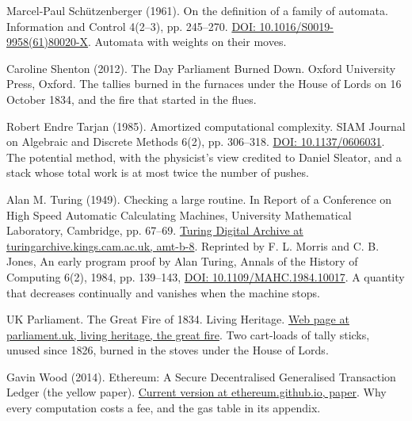 \documentclass[11pt,twoside]{article}
\theoremstyle{thielethm}
\theoremstyle{thieledef}
\theoremstyle{thieledef}
\theoremstyle{thieledef}
\theoremstyle{thielethm}
\theoremstyle{thieleobs}
\theoremstyle{thielethm}
\begin{document}
\noindent Marcel-Paul Sch\"utzenberger (1961). On the definition of a family of automata. Information and Control 4(2--3), pp. 245--270. \href{https://doi.org/10.1016/S0019-9958(61)80020-X}{DOI: 10.1016/S0019-9958(61)80020-X}. Automata with weights on their moves.
\par\medskip

\noindent Caroline Shenton (2012). The Day Parliament Burned Down. Oxford University Press, Oxford. The tallies burned in the furnaces under the House of Lords on 16 October 1834, and the fire that started in the flues.
\par\medskip

\noindent Robert Endre Tarjan (1985). Amortized computational complexity. SIAM Journal on Algebraic and Discrete Methods 6(2), pp. 306--318. \href{https://doi.org/10.1137/0606031}{DOI: 10.1137/0606031}. The potential method, with the physicist's view credited to Daniel Sleator, and a stack whose total work is at most twice the number of pushes.
\par\medskip

\noindent Alan M. Turing (1949). Checking a large routine. In Report of a Conference on High Speed Automatic Calculating Machines, University Mathematical Laboratory, Cambridge, pp. 67--69. \href{https://turingarchive.kings.cam.ac.uk/publications-lectures-and-talks-amtb/amt-b-8}{Turing Digital Archive at turingarchive.kings.cam.ac.uk, amt-b-8}. Reprinted by F. L. Morris and C. B. Jones, An early program proof by Alan Turing, Annals of the History of Computing 6(2), 1984, pp. 139--143, \href{https://doi.org/10.1109/MAHC.1984.10017}{DOI: 10.1109/MAHC.1984.10017}. A quantity that decreases continually and vanishes when the machine stops.
\par\medskip

\noindent UK Parliament. The Great Fire of 1834. Living Heritage. \href{https://www.parliament.uk/about/living-heritage/building/palace/architecture/palacestructure/great-fire/}{Web page at parliament.uk, living heritage, the great fire}. Two cart-loads of tally sticks, unused since 1826, burned in the stoves under the House of Lords.
\par\medskip

\noindent Gavin Wood (2014). Ethereum: A Secure Decentralised Generalised Transaction Ledger (the yellow paper). \href{https://ethereum.github.io/yellowpaper/paper.pdf}{Current version at ethereum.github.io, paper}. Why every computation costs a fee, and the gas table in its appendix.
\par\medskip
\end{document}
